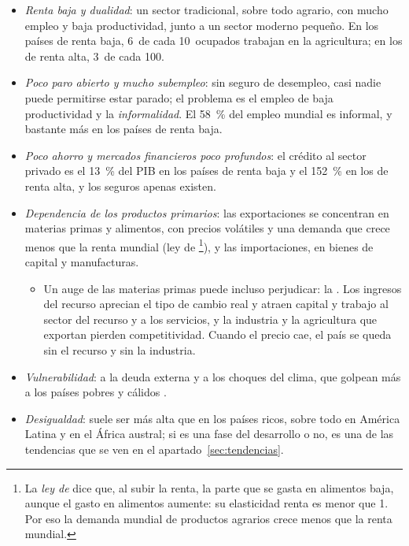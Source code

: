 \documentclass[11pt]{article}
\begin{document}
\begin{itemize}
\item \emph{Renta baja y dualidad}: un sector tradicional, sobre todo agrario, con mucho empleo y baja productividad, junto a un sector moderno pequeño. En los países de renta baja, 6~de cada 10~ocupados trabajan en la agricultura; en los de renta alta, 3~de cada 100.
\item \emph{Poco paro abierto y mucho subempleo}: sin seguro de desempleo, casi nadie puede permitirse estar parado; el problema es el empleo de baja productividad y la \emph{informalidad}. El 58~\% del empleo mundial es informal, y bastante más en los países de renta baja\nocite{OIT2023Informal}.
\item \emph{Poco ahorro y mercados financieros poco profundos}: el crédito al sector privado es el 13~\% del PIB en los países de renta baja y el 152~\% en los de renta alta, y los seguros apenas existen\nocite{BM2026WDI}.
\item \emph{Dependencia de los productos primarios}: las exportaciones se concentran en materias primas y alimentos, con precios volátiles y una demanda que crece menos que la renta mundial (ley de \footnote{La \emph{ley de } dice que, al subir la renta, la parte que se gasta en alimentos baja, aunque el gasto en alimentos aumente: su elasticidad renta es menor que 1. Por eso la demanda mundial de productos agrarios crece menos que la renta mundial.}), y las importaciones, en bienes de capital y manufacturas.
  \begin{itemize}
  \item Un auge de las materias primas puede incluso perjudicar: la . Los ingresos del recurso aprecian el tipo de cambio real y atraen capital y trabajo al sector del recurso y a los servicios, y la industria y la agricultura que exportan pierden competitividad\nocite{CordenNeary1982}. Cuando el precio cae, el país se queda sin el recurso y sin la industria.
  \end{itemize}
\item \emph{Vulnerabilidad}: a la deuda externa y a los choques del clima, que golpean más a los países pobres y cálidos  .
\item \emph{Desigualdad}: suele ser más alta que en los países ricos, sobre todo en América Latina y en el África austral; si es una fase del desarrollo o no, es una de las tendencias que se ven en el apartado~\ref{sec:tendencias}.
\end{itemize}
\end{document}
